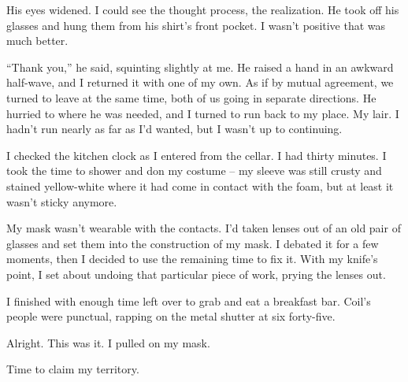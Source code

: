 His eyes widened.  I could see the thought process, the realization.  He took off his glasses and hung them from his shirt's front pocket.  I wasn't positive that was much better.



``Thank you,'' he said, squinting slightly at me.  He raised a hand in an awkward half-wave, and I returned it with one of my own.  As if by mutual agreement, we turned to leave at the same time, both of us going in separate directions.  He hurried to where he was needed, and I turned to run back to my place.  My lair.  I hadn't run nearly as far as I'd wanted, but I wasn't up to continuing.



I checked the kitchen clock as I entered from the cellar.  I had thirty minutes.  I took the time to shower and don my costume – my sleeve was still crusty and stained yellow-white where it had come in contact with the foam, but at least it wasn't sticky anymore.



My mask wasn't wearable with the contacts.  I'd taken lenses out of an old pair of glasses and set them into the construction of my mask.   I debated it for a few moments, then I decided to use the remaining time to fix it.  With my knife's point, I set about undoing that particular piece of work, prying the lenses out.



I finished with enough time left over to grab and eat a breakfast bar.  Coil's people were punctual, rapping on the metal shutter at six forty-five.



Alright.  This was it.  I pulled on my mask.



Time to claim my territory.





